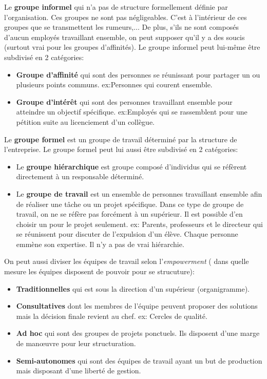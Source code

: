 \documentclass[12pt]{article}
\begin{document}
		Le \textbf{groupe informel} qui n'a pas de structure formellement définie par l'organisation. Ces groupes ne sont pas négligeables. C'est à l'intérieur de ces groupes que se transmettent les rumeurs,... De plus, s'ils ne sont composés d'aucun employés travaillant ensemble, on peut supposer qu'il y a des soucis (surtout vrai pour les groupes d'affinités). Le groupe informel peut lui-même être subdivisé en 2 catégories:
		\begin{itemize}
		\item \textbf{Groupe d'affinité} qui sont des personnes se réunissant pour partager un ou plusieurs points communs.\newline 
		ex:Personnes qui courent ensemble.
		\item \textbf{Groupe d'intérêt} qui sont des personnes travaillant ensemble pour atteindre un objectif spécifique.\newline 
		ex:Employés qui se rassemblent pour une pétition suite au licenciement d'un collègue. \newline
		\end{itemize}
		
		Le \textbf{groupe formel} est un groupe de travail déterminé par la structure de l'entreprise. Le groupe formel peut lui aussi être subdivisé en 2 catégories:
		\begin{itemize}
		\item Le \textbf{groupe hiérarchique} est groupe composé d'individus qui se réfèrent directement à un responsable déterminé.
		\item Le \textbf{groupe de travail} est un ensemble de personnes travaillant ensemble afin de réaliser une tâche ou un projet spécifique. Dans ce type de groupe de travail, on ne se réfère pas forcément à un supérieur. Il est possible d'en choisir un pour le projet seulement.\newline
		ex: Parents, professeurs et le directeur qui se réunissent pour discuter de l'expulsion d'un élève. Chaque personne emmène son expertise. Il n'y a pas de vrai hiérarchie. \newline
		\end{itemize}
		
		On peut aussi diviser les équipes de travail selon l'\textit{empowerment} ( dans quelle mesure les équipes disposent de pouvoir pour se strucuture):
		\begin{itemize}
		\item \textbf{Traditionnelles} qui est sous la direction d'un supérieur (organigramme).
		\item \textbf{Consultatives} dont les membres de l'équipe peuvent proposer des solutions mais la décision finale revient au chef. \newline
		ex: Cercles de qualité.
		\item \textbf{Ad hoc} qui sont des groupes de projets ponctuels. Ils disposent d'une marge de man\oe uvre pour leur structuration.
		\item \textbf{Semi-autonomes} qui sont des équipes de travail ayant un but de production mais disposant d'une liberté de gestion. 
		\end{itemize}
		
\end{document}
